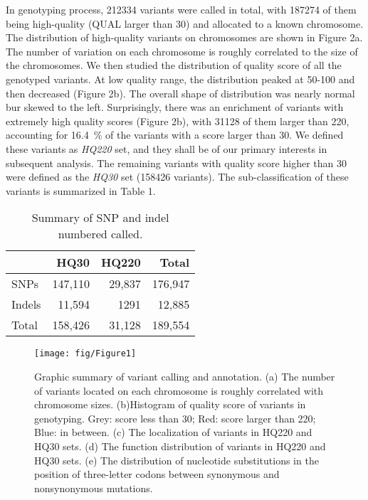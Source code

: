 \documentclass[a4paper, 12pt]{article}
\begin{document}
				In genotyping process, 212334 variants were called in total, with 187274 of them being high-quality (QUAL larger than 30) and allocated to a known chromosome. The distribution of high-quality variants on chromosomes are shown in Figure 2a. The number of variation on each chromosome is roughly correlated to the size of the chromosomes. We then studied the distribution of quality score of all the genotyped variants. At low quality range, the distribution peaked at 50-100 and then decreased (Figure 2b). The overall shape of distribution was nearly normal bur skewed to the left. Surprisingly, there was an enrichment of variants with extremely high quality scores (Figure 2b), with 31128 of them larger than 220, accounting for 16.4~\% of the variants with a score larger than 30. We defined these variants as \textit{HQ220} set, and they shall be of our primary interests in subsequent analysis. The remaining variants with quality score higher than 30 were defined as the \textit{HQ30} set (158426 variants). The sub-classification of these variants is summarized in Table 1.
				\\
				\begin{table}[!h]
					\captionsetup{singlelinecheck=false, justification=raggedright, labelsep=period}
					\caption{Summary of SNP and indel numbered called.}
					\begin{tabular}{lrrr}
						\toprule
						\textbf{} &	\textbf{HQ30} & \textbf{HQ220} & \textbf{Total}
						\\\midrule
						SNPs & 147,110 & 29,837 & 176,947
						\\	Indels & 11,594 & 1291 & 12,885
						\\\midrule
						Total & 158,426 & 31,128 & 189,554
						\\\bottomrule
					\end{tabular}
				\end{table}
				
					\begin{figure*}
					\captionsetup{singlelinecheck=false, justification=raggedright, labelsep=period}
					\centering
					\texttt{[image: fig/Figure1]}
					\caption[]{Graphic summary of variant calling and annotation. (a) The number of variants located on each chromosome is roughly correlated with chromosome sizes. (b)Histogram of quality score of variants in genotyping. Grey: score less than 30; Red: score larger than 220; Blue: in between. (c) The localization of variants in HQ220 and HQ30 sets. (d) The function distribution of variants in HQ220 and HQ30 sets. (e) The distribution of nucleotide substitutions in the position of three-letter codons between synonymous and nonsynonymous mutations.}
				\end{figure*}
			
\end{document}
